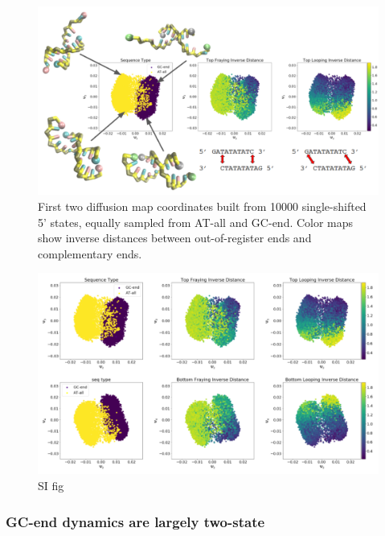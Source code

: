\documentclass[journal=jpcbfk,manuscript=article]{achemso}
\begin{document}
\begin{figure}[ht!]
	\begin{center}
        \includegraphics[width=\textwidth]{Figs/figs_0804/GC-end_dmaps.png}
        \caption{First two diffusion map coordinates built from 10000 single-shifted 5' states, equally sampled from AT-all and GC-end. Color maps show inverse distances between out-of-register ends and complementary ends. }
        \label{fig:GC-end_dmaps}
	\end{center}
\end{figure}

\begin{figure}[ht!]
	\begin{center}
        \includegraphics[width=\textwidth]{Figs/figs_0804/GC-end_dmaps_full.PNG}
        \caption{SI fig }
        \label{fig:GC-end_dmaps_full}
	\end{center}
\end{figure}

\subsubsection{\label{sec:Results}GC-end dynamics are largely two-state}
\end{document}
